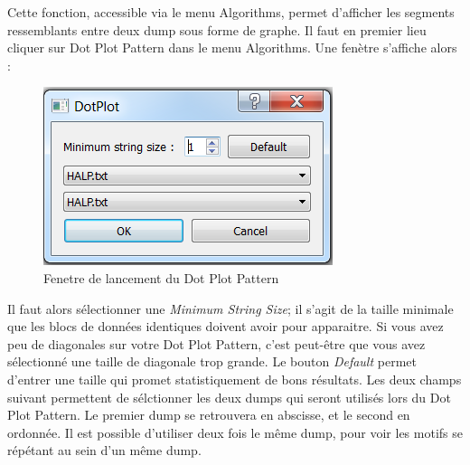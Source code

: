 Cette fonction, accessible via le menu Algorithms, permet d'afficher les segments ressemblants entre deux dump sous forme de graphe. Il faut en premier lieu cliquer sur Dot Plot Pattern dans le menu Algorithms. Une fenètre s'affiche alors :

\begin{figure}[!h]
  \begin{center}
  \includegraphics[width=\textwidth]{dotplotdialog.png}
  \caption{Fenetre de lancement du Dot Plot Pattern}
  \label{dotplotdialog}
  \end{center}
\end{figure}

Il faut alors sélectionner une \emph{Minimum String Size}; il s'agit de la taille minimale que les blocs de données identiques doivent avoir pour apparaitre. Si vous avez peu de diagonales sur votre Dot Plot Pattern, c'est peut-être que vous avez sélectionné une taille de diagonale trop grande. Le bouton \emph{Default} permet d'entrer une taille qui promet statistiquement de bons résultats.
Les deux champs suivant permettent de sélctionner les deux dumps qui seront utilisés lors du Dot Plot Pattern. Le premier dump se retrouvera en abscisse, et le second en ordonnée. Il est possible d'utiliser deux fois le même dump, pour voir les motifs se répétant au sein d'un même dump.

